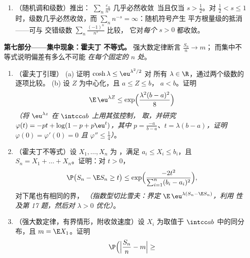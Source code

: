 \begin{problem}
\begin{enumerate}[resume]
        (c) 推出 $\P\bigl(\abs{T_n} > \frac{s_n}2\bigr)
        \geq \frac3{16}$，并由此得出
        $\sum_nx_n\varepsilon_n$ 几乎必然发散；因此
        得到二分结论：
        \[
        \sum_nx_n\varepsilon_n\ \text{几乎必然收敛}
        \iff \sum_nx_n^2 < \infty .
        \]
  \item （随机调和级数）推出：
        $\sum_n\frac{\varepsilon_n}{n^s}$ 几乎必然收敛\
        当且仅当 $s > \frac12$。对 $\frac12 < s \leq
        1$ 时，级数几乎必然收敛，而
        $\sum_nn^{-s} = \infty$：随机符号产生
        平方根量级的抵消——可与
        交错级数 $\sum_n\frac{(-1)^n}{n^s}$ 比较，
        它对\emph{每个} $s > 0$ 都收敛。
\end{enumerate}

\medskip
\noindent\textbf{第七部分——集中现象：霍夫丁
不等式。} 强大数定律断言 $\frac{S_n}n \to m$；
而集中不等式说明偏差有多么不可能
\emph{在每个固定的 $n$ 处}。
\begin{enumerate}[resume]
  \item（霍夫丁引理）
        (a) 证明 $\cosh\lambda \leq \eu^{\lambda^2/2}$ 对
        所有 $\lambda \in \R$，通过两个级数的
        逐项比较。
        (b) 设 $Z$ 为中心化，且 $a \leq Z \leq b$，
        $a < b$。证明
        \[
        \E\,\eu^{\lambda Z} \leq
        \exp\Bigl(\frac{\lambda^2(b - a)^2}8\Bigr)
        \]
        \emph{（将 $\eu^{\lambda z}$ 在 $\intcc ab$ 上用其弦控制，
        取，并研究 $\varphi(t)
        = -pt + \log(1 - p + p\eu^t)$，其中 $p =
        \frac{-a}{b-a}$、$t = \lambda(b - a)$，证明
        $\varphi(0) = \varphi'(0) = 0$ 且 $\varphi''
        \leq \frac14$）}。
  \item（霍夫丁不等式）设 $X_1, \dots, X_n$ 为
        ，满足 $a_i \leq X_i \leq b_i$，且 $S_n =
        X_1 + \dots + X_n$。证明：对 $t > 0$，
        \[
        \P\bigl(S_n - \E S_n \geq t\bigr) \leq
        \exp\Bigl(\frac{-2t^2}{\sum_{i=1}^n(b_i -
        a_i)^2}\Bigr),
        \]
        对下尾也有相同的界，
        \emph{（指数型切比雪夫：界定
        $\E\,\eu^{\lambda(S_n - \E S_n)}$，利用
        性及第 17 题，然后对
        $\lambda > 0$ 优化）}。
  \item（强大数定律，有界情形，附收敛速度）设
        $X_i$ 为取值于 $\intcc ab$ 中的同分布，且 $m
        = \E X_1$。证明
        \[
        \P\Bigl(\Bigl|\frac{S_n}n - m\Bigr| \geq
\]
\end{enumerate}
\end{problem}
